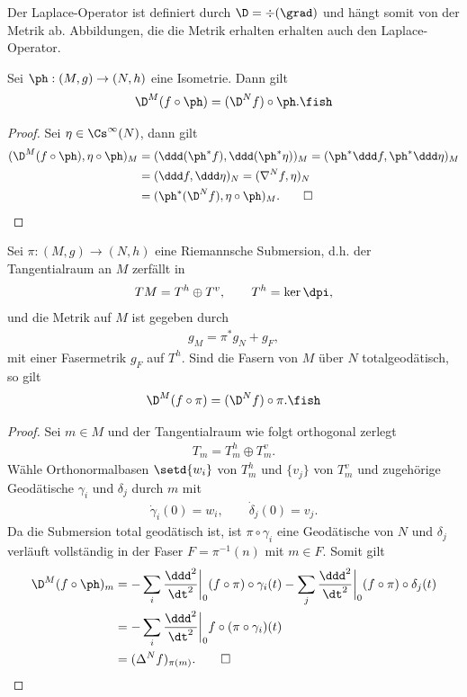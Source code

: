 \documentclass[%
	paper=a5,%
	fleqn,%
	DIV=18,%
	BCOR=0mm,
	fontsize=11pt,
	titlepage=false,%
	bibliography=totoc,
	DIV=18,%
	twoside=true,
	pdftitle=Riemannsche Geometrie,
	pdfauthor=Uwe Semmelmann,
	numbers=noendperiod]%
	{scrbook}
\begin{document}
Der Laplace-Operator ist definiert durch $\D =\div(\grad)$  und hängt somit von der Metrik ab. Abbildungen, die die Metrik erhalten erhalten auch den Laplace-Operator.

\begin{prop}
Sei $\ph: (M,g)\to (N,h)$ eine Isometrie. Dann gilt
\begin{align*}
\D^M(f\circ\ph) = (\D^Nf)\circ\ph.\fish
\end{align*}
\end{prop}
\begin{proof}
Sei $\eta\in\Cs^\infty(N)$, dann gilt
\begin{align*}
(\D^M(f\circ\ph),\eta\circ\ph)_{M} &= 
(\ddd(\ph^* f),\ddd(\ph^*\eta))_{M}
=
(\ph^*\ddd f,\ph^*\ddd\eta)_{M}\\
&=
(\ddd f,\ddd\eta)_{N}
=
(\nabla^N f,\eta)_{N}\\
&= 
(\ph^*(\D^N f),\eta\circ\ph)_{M}.\qed
\end{align*} 
\end{proof}

\begin{prop}
Sei $\pi: (M,g)\to (N,h)$ eine Riemannsche Submersion, d.h. der Tangentialraum an $M$ zerfällt in
\begin{align*}
TM = T^h\oplus T^v,\qquad T^h= \ker\dpi,
\end{align*}
und die Metrik auf $M$ ist gegeben durch
\begin{align*}
g_{M} = \pi^*g_{N} + g_{F},
\end{align*}
mit einer Fasermetrik $g_{F}$ auf $T^h$. Sind die Fasern von $M$ über $N$ totalgeodätisch, so gilt
\begin{align*}
\D^M(f\circ\pi) = (\D^N f)\circ\pi.\fish
\end{align*}
\end{prop}
\begin{proof}
Sei $m\in M$ und der Tangentialraum wie folgt orthogonal zerlegt
\begin{align*}
T_{m} = T_{m}^h \oplus T_{m}^v.
\end{align*}
Wähle Orthonormalbasen $\setd{w_{i}}$ von $T_{m}^h$ und $\{v_{j}\}$ von $T_{m}^v$ und zugehörige Geodätische $\gamma_{i}$ und $\delta_{j}$ durch $m$ mit
\begin{align*}
\dot\gamma_{i}(0) = w_{i},\qquad \dot\delta_{j}(0) = v_{j}.
\end{align*}
Da die Submersion total geodätisch ist, ist $\pi\circ\gamma_{i}$ eine Geodätische von $N$ und $\delta_{j}$ verläuft vollständig in der Faser $F=\pi^{-1}(n)$ mit $m\in F$. Somit gilt
\begin{align*}
\D^M(f\circ\ph)_{m} &= -\sum_{i}\frac{\ddd^2}{\dt^2}\bigg|_{0} (f\circ\pi)\circ \gamma_{i}(t)
 -\sum_{j}\frac{\ddd^2}{\dt^2}\bigg|_{0} (f\circ\pi)\circ \delta_{j}(t)\\
&  = -\sum_{i}\frac{\ddd^2}{\dt^2}\bigg|_{0} f\circ(\pi\circ \gamma_{i})(t)\\
&  = (\Delta^N f)_{\pi(m)}.\qed
\end{align*}
\end{proof}
\end{document}
